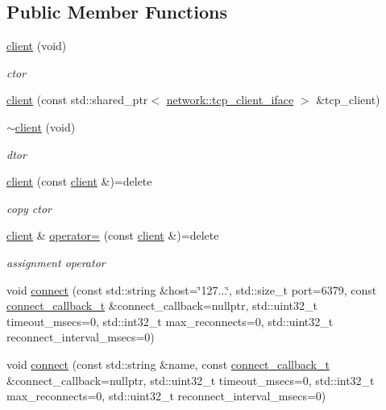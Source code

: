 \subsection*{Public Member Functions}
\begin{DoxyCompactItemize}
\item 
\hyperlink{classcpp__redis_1_1client_a80354f41d084dfc3a41df581c803b792}{client} (void)
\begin{DoxyCompactList}\small\item\em ctor \end{DoxyCompactList}\item 
\hyperlink{classcpp__redis_1_1client_ae879c3a6829a2da9d03f80c1ec4b8d9b}{client} (const std\+::shared\+\_\+ptr$<$ \hyperlink{classcpp__redis_1_1network_1_1tcp__client__iface}{network\+::tcp\+\_\+client\+\_\+iface} $>$ \&tcp\+\_\+client)
\item 
\hyperlink{classcpp__redis_1_1client_aca7030c8bd6856f10314b2862d1bae79}{$\sim$client} (void)
\begin{DoxyCompactList}\small\item\em dtor \end{DoxyCompactList}\item 
\hyperlink{classcpp__redis_1_1client_ab938aeb2a144629fd269594e4af08168}{client} (const \hyperlink{classcpp__redis_1_1client}{client} \&)=delete
\begin{DoxyCompactList}\small\item\em copy ctor \end{DoxyCompactList}\item 
\hyperlink{classcpp__redis_1_1client}{client} \& \hyperlink{classcpp__redis_1_1client_afdab99b1752e759ab3ce9477f2cb092d}{operator=} (const \hyperlink{classcpp__redis_1_1client}{client} \&)=delete
\begin{DoxyCompactList}\small\item\em assignment operator \end{DoxyCompactList}\item 
void \hyperlink{classcpp__redis_1_1client_adda8b3e7b4f9c80ac052753b39178dd5}{connect} (const std\+::string \&host=\char`\"{}127...\char`\"{}, std\+::size\+\_\+t port=6379, const \hyperlink{classcpp__redis_1_1client_a4bb592b64ededde5a6fcf8111ca2548f}{connect\+\_\+callback\+\_\+t} \&connect\+\_\+callback=nullptr, std\+::uint32\+\_\+t timeout\+\_\+msecs=0, std\+::int32\+\_\+t max\+\_\+reconnects=0, std\+::uint32\+\_\+t reconnect\+\_\+interval\+\_\+msecs=0)
\item 
void \hyperlink{classcpp__redis_1_1client_a15bcb0885129480543482a7da52af892}{connect} (const std\+::string \&name, const \hyperlink{classcpp__redis_1_1client_a4bb592b64ededde5a6fcf8111ca2548f}{connect\+\_\+callback\+\_\+t} \&connect\+\_\+callback=nullptr, std\+::uint32\+\_\+t timeout\+\_\+msecs=0, std\+::int32\+\_\+t max\+\_\+reconnects=0, std\+::uint32\+\_\+t reconnect\+\_\+interval\+\_\+msecs=0)

\end{DoxyCompactItemize}
